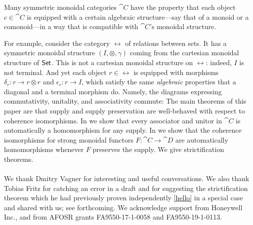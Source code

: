 Many symmetric monoidal categories $\cat{C}$ have the property that each object $c\in\cat{C}$ is equipped with a certain algebraic structure---say that of a monoid or a comonoid---in a way that is compatible with $\cat{C}$'s monoidal structure.

For example, consider the category $\rel$ of relations between sets. It has a symmetric monoidal structure $(I, \otimes, \gamma)$ coming from the cartesian monoidal structure of ${\mathsf{Set}}$. This is not a cartesian monoidal structure on $\rel$: indeed, $I$ is not terminal. And yet each object $r\in\rel$ is equipped with morphisms $\delta_r\colon r\to r\otimes r$ and $\epsilon_r\colon r\to I$, which satisfy the same \emph{algebraic} properties that a diagonal and a terminal morphism do. Namely, the diagrams expressing commutativity, unitality, and associativity commute:
The main theorems of this paper are that supply and supply preservation are
well-behaved with respect to coherence isomorphisms. In we show that every
associator and unitor in $\cat{C}$ is automatically a homomorphism for any
supply. In we show that the coherence isomorphisms for strong monoidal functors
$F\colon\cat{C}\to\cat{D}$ are automatically homomorphisms whenever $F$
preserves the supply. We give strictification theorems. 

 
\paragraph{}
We thank Dmitry Vagner for interesting and useful conversations. We also thank
Tobias Fritz for catching an error in a draft and for suggesting the
strictification theorem which he had previously proven independently \ref{hello} in
a special case and shared with us; see \cite{spivak_poly_2020} forthcoming.
We acknowledge support from Honeywell Inc., and from AFOSR grants FA9550-17-1-0058 and FA9550-19-1-0113.
